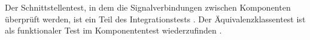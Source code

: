 Der Schnittstellentest, in dem die Signalverbindungen zwischen Komponenten überprüft werden, ist ein Teil des 
Integrationstests \cite[vgl.][S. 51, S. 217]{integration}.
Der Äquivalenzklassentest ist als funktionaler Test im Komponententest wiederzufinden \cite[vgl.][S. 41 f.]{integration}\cite[vgl.][S. 114 ff.]{equiinformatic}.

